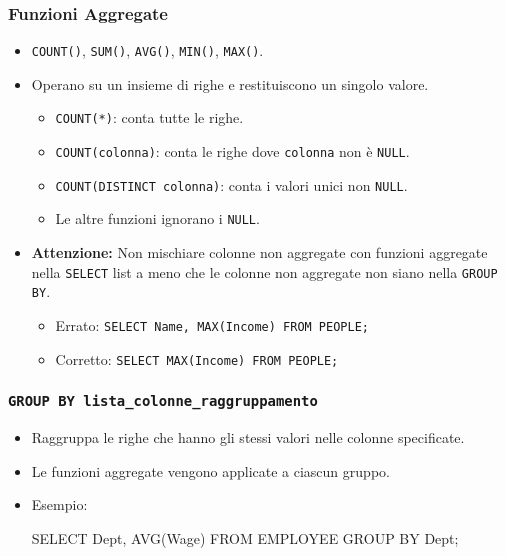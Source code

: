 \documentclass{article}
\begin{document}
	\subsubsection{Funzioni Aggregate}
	\begin{itemize}
		\item \texttt{COUNT()}, \texttt{SUM()}, \texttt{AVG()}, \texttt{MIN()}, \texttt{MAX()}.
		\item Operano su un insieme di righe e restituiscono un singolo valore.
		\begin{itemize}
			\item \texttt{COUNT(*)}: conta tutte le righe.
			\item \texttt{COUNT(colonna)}: conta le righe dove \texttt{colonna} non è \texttt{NULL}.
			\item \texttt{COUNT(DISTINCT colonna)}: conta i valori unici non \texttt{NULL}.
			\item Le altre funzioni ignorano i \texttt{NULL}.
		\end{itemize}
		\item \textbf{Attenzione:} Non mischiare colonne non aggregate con funzioni aggregate nella \texttt{SELECT} list a meno che le colonne non aggregate non siano nella \texttt{GROUP BY}.
		\begin{itemize}
			\item Errato: \texttt{SELECT Name, MAX(Income) FROM PEOPLE;}
			\item Corretto: \texttt{SELECT MAX(Income) FROM PEOPLE;}
		\end{itemize}
	\end{itemize}
	
	\subsubsection{\texttt{GROUP BY lista\_colonne\_raggruppamento}}
	\begin{itemize}
		\item Raggruppa le righe che hanno gli stessi valori nelle colonne specificate.
		\item Le funzioni aggregate vengono applicate a ciascun gruppo.
		\item Esempio:
		\begin{sqlcode}
			SELECT Dept, AVG(Wage) FROM EMPLOYEE GROUP BY Dept;
		\end{sqlcode}
	\end{itemize}
	
\end{document}
